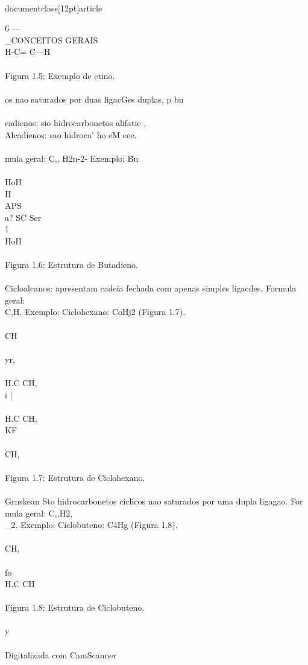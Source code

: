 \\documentclass[12pt]{article}
\begin{document}
{6 —\\_CONCEITOS GERAIS\\
H-C= C—H\\
\\
Figura 1.5: Exemplo de etino.\\
\\
os nao saturados por duas ligacGes duplas, p bn\\
\\
cadienos: sio hidrocarbonetos alifatic ,\\
Alcadienos: sao hidroca' ho eM eee.\\
\\
mula geral: C,, H2n-2- Exemplo: Bu\\
\\
HoH\\
H\\
APS\\
a? SC Ser\\
1\\
HoH\\
\\
Figura 1.6: Estrutura de Butadieno.\\
\\
Cicloalcanos: apresentam cadeia fechada com apenas simples ligacdes. Formula geral:\\
C,H. Exemplo: Ciclohexano: CoHj2 (Figura 1.7).\\
\\
CH\\
\\
yr,\\
\\
H.C CH,\\
i |\\
\\
H.C CH,\\
KF\\
\\
CH,\\
\\
Figura 1.7: Estrutura de Ciclohexano.\\
\\
Grnskean Sto hidrocarbonetos ciclicos nao saturados por uma dupla ligagao. For\\
mula geral: C,,H2,\\_2. Exemplo: Ciclobuteno: C4Hg (Figura 1.8).\\
\\
CH,\\
\\
fo\\
H.C CH\\
\\
Figura 1.8: Estrutura de Ciclobuteno.\\
\\
y\\
\\
Digitalizada com CamScanner\\

}
\end{document}
